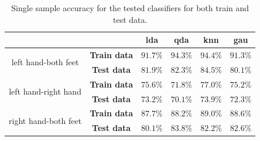 \begin{table}
   \centering
   \begin{tabular}{|c|c|cccc|}
      \hline
      & & lda & qda & knn & gau \\
      \hline
      \multirow{2}{*}{left hand-both feet} & \textbf{Train data} & $91.7\%$ & $94.3\%$ & $94.4\%$ & $91.3\%$ \\
      & \textbf{Test data} & $81.9\%$ & $82.3\%$ & $84.5\%$ & $80.1\%$ \\
      \hline
      \multirow{2}{*}{left hand-right hand} & \textbf{Train data} & $75.6\%$ & $71.8\%$ & $77.0\%$ & $75.2\%$ \\
      & \textbf{Test data} & $73.2\%$ & $70.1\%$ & $73.9\%$ & $72.3\%$ \\
      \hline
      \multirow{2}{*}{right hand-both feet} & \textbf{Train data} & $87.7\%$ & $88.2\%$ & $89.0\%$ & $88.6\%$ \\
      & \textbf{Test data} & $80.1\%$ & $83.8\%$ & $82.2\%$ & $82.6\%$ \\
      \hline
   \end{tabular}
   \caption{Single sample accuracy for the tested classifiers for both train and test data.}
   \label{tab:class}
\end{table}


